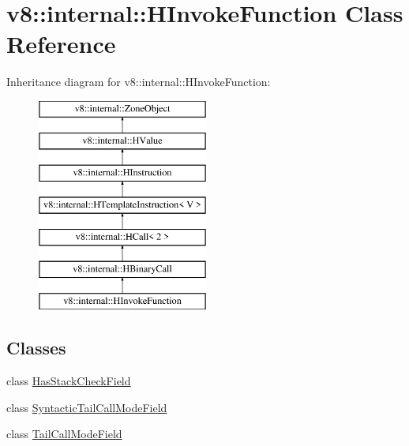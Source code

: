 \hypertarget{classv8_1_1internal_1_1_h_invoke_function}{}\section{v8\+:\+:internal\+:\+:H\+Invoke\+Function Class Reference}
\label{classv8_1_1internal_1_1_h_invoke_function}
Inheritance diagram for v8\+:\+:internal\+:\+:H\+Invoke\+Function\+:\begin{figure}[H]
\begin{center}
\leavevmode
\includegraphics[height=7.000000cm]{classv8_1_1internal_1_1_h_invoke_function}
\end{center}
\end{figure}
\subsection*{Classes}
\begin{DoxyCompactItemize}
\item 
class \hyperlink{classv8_1_1internal_1_1_h_invoke_function_1_1_has_stack_check_field}{Has\+Stack\+Check\+Field}
\item 
class \hyperlink{classv8_1_1internal_1_1_h_invoke_function_1_1_syntactic_tail_call_mode_field}{Syntactic\+Tail\+Call\+Mode\+Field}
\item 
class \hyperlink{classv8_1_1internal_1_1_h_invoke_function_1_1_tail_call_mode_field}{Tail\+Call\+Mode\+Field}
\end{DoxyCompactItemize}

